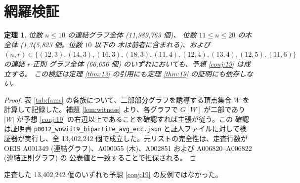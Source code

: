 \documentclass[paper=a4,fontsize=10.5pt,jafontsize=10.5pt]{jlreq}
\theoremstyle{plain}
\newtheorem{theorem}{定理}[section]
\theoremstyle{definition}
\begin{document}
\section{網羅検証}\label{sec:check}

\begin{theorem}\label{thm:main}
位数 $n \le 10$ の連結グラフ全体 (11,989,763 個)、
位数 $11 \le n \le 20$ の木全体 (1,345,823 個。位数 $10$ 以下の
木は前者に含まれる)、および $(n, r) \in \{(12, 3), (14, 3), (16, 3), (18, 3), (11, 4), (12, 4), (13, 4), (12, 5), (11, 6)\}$ の連結 $r$-正則
グラフ全体 (66,656 個) のいずれにおいても、予想 \ref{conj:19} は成立する。
この検証は定理 \ref{thm:13} の引用にも定理 \ref{thm:19} の証明にも依存しない。
\end{theorem}

\begin{proof}
表 \ref{tab:fams} の各族について、二部部分グラフを誘導する頂点集合 $W$ を
計算して記録した。補題 \ref{lem:witness} より、各グラフで $G[W]$ が二部であり
$|W|$ が予想 \ref{conj:19} の右辺以上であることを確認すれば主張が従う。この
確認は証明書 \texttt{p0012\_wowii19\_bipartite\_avg\_ecc.json} と証人ファイルに対して検証器が実行し、全
13,402,242 個で成立した。元リストの完全性は、走査行数が OEIS A001349
(連結グラフ)、A000055 (木)、A002851 および A006820--A006822 (連結正則グラフ) の
公表値と一致することで担保される。
\end{proof}

走査した 13,402,242 個のいずれも予想 \ref{conj:19} の反例ではなかった。
\end{document}
